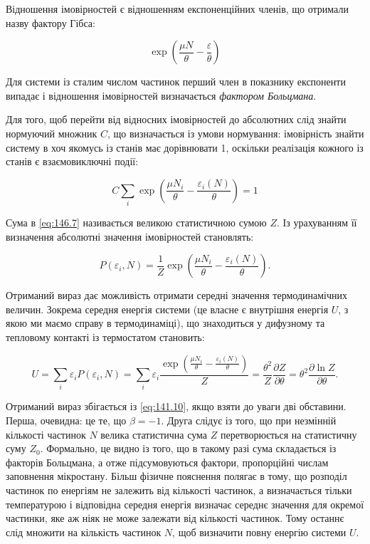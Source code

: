 Відношення імовірностей є відношенням експоненційних членів, що отримали назву фактору Гібса:

\begin{equation}
	\exp\left(\frac{\mu N}{\theta}-\frac{\varepsilon}{\theta}\right)
	\label{eq:146.6}
\end{equation}

Для системи із сталим числом частинок перший член в показнику експоненти випадає і відношення імовірностей визначається \emph{фактором Больцмана}.

Для того, щоб перейти від відносних імовірностей до абсолютних слід знайти нормуючий множник $C$, що визначається із умови нормування: імовірність знайти систему в хоч якомусь із станів має дорівнювати 1, оскільки реалізація кожного із станів є взаємовиключні події:

\begin{equation}
	C\sum_{i}\exp\left(\frac{\mu N_i}{\theta}-\frac{\varepsilon_i\left(N\right)}{\theta}\right)=1
	\label{eq:146.7}
\end{equation}

Сума в \eqref{eq:146.7} називається великою статистичною сумою $Z$. Із урахуванням її визначення абсолютні значення імовірностей становлять:

\begin{equation}
	P\left(\varepsilon_i,N\right)=\frac1Z \exp\left(\frac{\mu N_i}{\theta}-\frac{\varepsilon_i\left(N\right)}{\theta}\right).
	\label{eq:146.8}
\end{equation}

Отриманий вираз дає можливість отримати середні значення термодинамічних величин. Зокрема середня енергія системи (це власне є внутрішня енергія $U$, з якою ми маємо справу в термодинаміці), що знаходиться у дифузному та тепловому контакті із термостатом становить:

\begin{equation}
	U =\sum_{i}{\varepsilon_iP\left(\varepsilon_i,N\right)}=\sum_{i}{\varepsilon_i\frac{\exp\left(\frac{\mu N_i}{\theta}-\frac{\varepsilon_i\left(N\right)}{\theta}\right)}{Z}}=\frac{\theta^2}{Z}\frac{\partial Z}{\partial\theta}=\theta^2\frac{\partial\ln{Z}}{\partial\theta}.
	\label{eq:146.9}
\end{equation}

Отриманий вираз збігається із \eqref{eq:141.10}, якщо взяти до уваги дві обставини. Перша, очевидна: це те, що $\beta = -1$. Друга слідує із того, що при незмінній кількості частинок $N$ велика статистична сума $Z$ перетворюється на статистичну суму $Z_0$. Формально, це видно із того, що в такому разі сума складається із факторів Больцмана, а отже підсумовуються фактори, пропорційні числам заповнення мікростану. Більш фізичне пояснення полягає в тому, що розподіл частинок по енергіям не залежить від кількості частинок, а визначається тільки температурою і відповідна середня енергія визначає середнє значення для окремої частинки, яке аж ніяк не може залежати від кількості частинок. Тому останнє слід множити на кількість частинок $N$, щоб визначити повну енергію системи $U$.


